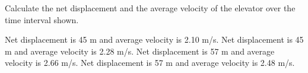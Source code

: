 \documentclass[]{exam}
\begin{document}
\begin{questions}
\question \label{ques:Unit02_Elevator2}

Calculate the net displacement and the average velocity of the elevator over the time interval shown.

\begin{choices}
\choice Net displacement is 45 m and average velocity is 2.10 m/s.
\choice Net displacement is 45 m and average velocity is 2.28 m/s.
\choice Net displacement is 57 m and average velocity is 2.66 m/s.
\CorrectChoice Net displacement is 57 m and average velocity is 2.48 m/s.
\end{choices}


\end{questions}
\end{document}
